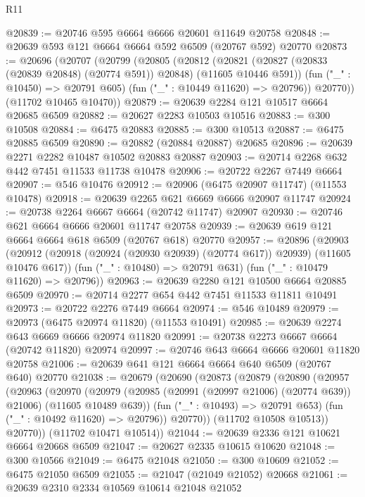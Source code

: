 \begin{lexlean}{R11}
\begin{coremodule}
@20839 := @20746 @595 @6664 @6666 @20601 @11649 @20758
@20848 := @20639 @593 @121 @6664 @6664 @592 @6509 (@20767 @592) @20770
@20873 := @20696
    (@20707
      (@20799
        (@20805
          (@20812
            (@20821 (@20827 (@20833 (@20839 @20848) (@20774 @591)) @20848) (@11605 @10446 @591))
            (fun ("_" : @10450) => @20791 @605)
            (fun ("_" : @10449 @11620) => @20796))
          @20770))
      (@11702 @10465 @10470))
@20879 := @20639 @2284 @121 @10517 @6664 @20685 @6509
@20882 := @20627 @2283 @10503 @10516
@20883 := @300 @10508
@20884 := @6475 @20883
@20885 := @300 @10513
@20887 := @6475 @20885 @6509
@20890 := @20882 (@20884 @20887) @20685
@20896 := @20639 @2271 @2282 @10487 @10502 @20883 @20887
@20903 := @20714 @2268 @632 @442 @7451 @11533 @11738 @10478
@20906 := @20722 @2267 @7449 @6664
@20907 := @546 @10476
@20912 := @20906 (@6475 @20907 @11747) (@11553 @10478)
@20918 := @20639 @2265 @621 @6669 @6666 @20907 @11747
@20924 := @20738 @2264 @6667 @6664 (@20742 @11747) @20907
@20930 := @20746 @621 @6664 @6666 @20601 @11747 @20758
@20939 := @20639 @619 @121 @6664 @6664 @618 @6509 (@20767 @618) @20770
@20957 := @20896
    (@20903
      (@20912 (@20918 (@20924 (@20930 @20939) (@20774 @617)) @20939) (@11605 @10476 @617))
      (fun ("_" : @10480) => @20791 @631)
      (fun ("_" : @10479 @11620) => @20796))
@20963 := @20639 @2280 @121 @10500 @6664 @20885 @6509
@20970 := @20714 @2277 @654 @442 @7451 @11533 @11811 @10491
@20973 := @20722 @2276 @7449 @6664
@20974 := @546 @10489
@20979 := @20973 (@6475 @20974 @11820) (@11553 @10491)
@20985 := @20639 @2274 @643 @6669 @6666 @20974 @11820
@20991 := @20738 @2273 @6667 @6664 (@20742 @11820) @20974
@20997 := @20746 @643 @6664 @6666 @20601 @11820 @20758
@21006 := @20639 @641 @121 @6664 @6664 @640 @6509 (@20767 @640) @20770
@21038 := @20679
    (@20690
      (@20873
        (@20879
          (@20890
            (@20957
              (@20963
                (@20970
                  (@20979
                    (@20985 (@20991 (@20997 @21006) (@20774 @639)) @21006)
                    (@11605 @10489 @639))
                  (fun ("_" : @10493) => @20791 @653)
                  (fun ("_" : @10492 @11620) => @20796))
                @20770))
            (@11702 @10508 @10513))
          @20770))
      (@11702 @10471 @10514))
@21044 := @20639 @2336 @121 @10621 @6664 @20668 @6509
@21047 := @20627 @2335 @10615 @10620
@21048 := @300 @10566
@21049 := @6475 @21048
@21050 := @300 @10609
@21052 := @6475 @21050 @6509
@21055 := @21047 (@21049 @21052) @20668
@21061 := @20639 @2310 @2334 @10569 @10614 @21048 @21052

\end{coremodule}
\end{lexlean}
